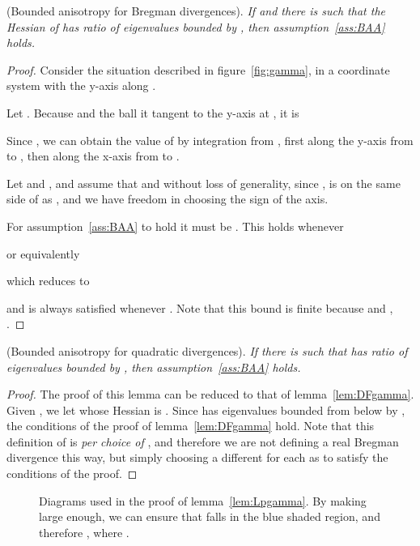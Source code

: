 \documentclass[11pt]{article}
\begin{document}
 (Bounded anisotropy for Bregman divergences).
\emph{
If  and there is  such that the Hessian of  has ratio of eigenvalues bounded by ,
	then assumption~\ref{ass:BAA} holds. 
}\begin{proof}
Consider the situation described in figure~\ref{fig:gamma}, 
	in a coordinate system with the y-axis along . 

Let . 
Because  and the ball  it tangent to the y-axis at , 
	it is 

Since , 
we can obtain the value of  by integration from , first 
	along the y-axis from  to , 
	then along the x-axis from  to . 

Let  and , 
	and assume that  and  without loss of generality, 
	since ,  is on the same side of  as , 
	and we have freedom in choosing the sign of the axis. 

For assumption~\ref{ass:BAA} to hold it must be . This holds whenever

or equivalently

which reduces to 

and is always satisfied whenever . 
Note that this bound is finite because  and , . 
\end{proof}



 (Bounded anisotropy for quadratic divergences).
\emph{
If there is  such that  has ratio of eigenvalues bounded by ,
	then assumption~\ref{ass:BAA} holds. 
}\begin{proof}
The proof of this lemma can be reduced to that of lemma~\ref{lem:DFgamma}.
Given , we let 
whose Hessian is . Since  has eigenvalues bounded from below by , 
	the conditions of the proof of lemma~\ref{lem:DFgamma} hold. 
Note that this definition of  is \emph{per choice of} , 
	and therefore we are not defining a real Bregman divergence this way, but simply choosing 
	a different  for each  as to satisfy the conditions of the proof. 

\end{proof}







\begin{figure}[htbp]
   \centering
	\quad\quad
   \caption{Diagrams used in the proof of lemma~\ref{lem:Lpgamma}. 
   	By making  large enough, we can ensure that  falls in the blue shaded region, and 
		therefore , where . 
   }
\end{figure}
\end{document}
